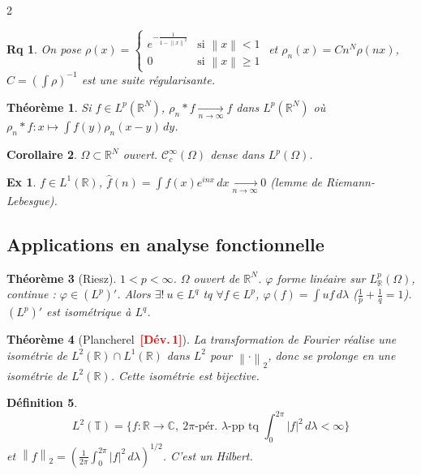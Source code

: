 \documentclass[10pt,a4paper]{article}
\theoremstyle{plan}
\newtheorem{theoreme}{Théorème}
\newtheorem{definition}[theoreme]{Définition}
\newtheorem{corollaire}[theoreme]{Corollaire}
\theoremstyle{planex}   %
\newtheorem*{exemple*}{Ex}
\newtheorem*{remarque*}{Rq}
\newcommand{\dev}[1]{\ \textcolor{red}{\textbf{[Dév.\,#1]}}}
\newcommand{\R}{\mathbb{R}}
\newcommand{\C}{\mathbb{C}}
\newcommand{\T}{\mathbb{T}}
\newcommand{\Cc}{\mathcal{C}}
\newcommand{\norm}[1]{\left\lVert #1\right\rVert}
\newcommand{\abs}[1]{\left\lvert #1\right\rvert}
\newcommand{\Lp}[1][p]{L^{#1}}
\begin{document}
\begin{multicols}{2}
\begin{remarque*}
On pose $\rho(x) = \begin{cases} e^{-\frac{1}{1 - \norm{x}^2}} & \text{si } \norm{x} < 1 \\ 0 & \text{si } \norm{x} \ge 1 \end{cases}$ et $\rho_n(x) = C n^N \rho(nx)$, $C = \left( \int \rho \right)^{-1}$ est une suite régularisante.
\end{remarque*}

\begin{theoreme}
Si $f \in \Lp(\R^N)$, $\rho_n * f \xrightarrow[n \to \infty]{} f$ dans $\Lp(\R^N)$ où $\rho_n * f : x \mapsto \int f(y) \rho_n(x-y)\,dy$.
\end{theoreme}

\begin{corollaire}
$\Omega \subset \R^N$ ouvert. $\Cc_c^\infty(\Omega)$ dense dans $\Lp(\Omega)$.
\end{corollaire}

\begin{exemple*}
$f \in L^1(\R)$, $\hat{f}(n) = \int f(x) e^{inx}\,dx \xrightarrow[n \to \infty]{} 0$ (lemme de Riemann-Lebesgue).
\end{exemple*}

\subsection{Applications en analyse fonctionnelle}

\begin{theoreme}[Riesz]
$1 < p < \infty$. $\Omega$ ouvert de $\R^N$. $\varphi$ forme linéaire sur $\Lp_\R(\Omega)$, continue : $\varphi \in (\Lp)'$. Alors $\exists!\ u \in L^q$ tq $\forall f \in \Lp$, $\varphi(f) = \int u f\,d\lambda$ ($\frac{1}{p} + \frac{1}{q} = 1$). $(\Lp)'$ est isométrique à $L^q$.
\end{theoreme}

\begin{theoreme}[Plancherel\dev{1}]
La transformation de Fourier réalise une isométrie de $L^2(\R) \cap L^1(\R)$ dans $L^2$ pour $\norm{\cdot}_2$, donc se prolonge en une isométrie de $L^2(\R)$. Cette isométrie est bijective.
\end{theoreme}

\begin{definition}
\[ L^2(\T) = \Big\{ f : \R \to \C,\ 2\pi\text{-pér. } \lambda\text{-pp tq } \textstyle\int_0^{2\pi} \abs{f}^2\,d\lambda < \infty \Big\} \]
et $\norm{f}_2 = \left( \frac{1}{2\pi} \int_0^{2\pi} \abs{f}^2\,d\lambda \right)^{1/2}$.
C'est un Hilbert.
\end{definition}


\end{multicols}
\end{document}
